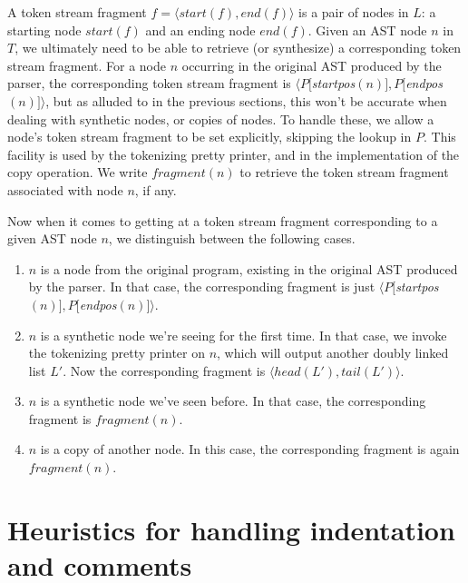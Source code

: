 A token stream fragment $f = \langle start(f), end(f) \rangle$ is a pair of
nodes in $L$: a starting node $start(f)$ and an ending node $end(f)$. Given an
AST node $n$ in $T$, we ultimately need to be able to retrieve (or synthesize)
a corresponding token stream fragment. For a node $n$ occurring in the original
AST produced by the parser, the corresponding token stream fragment is $\langle
P[$\emph{startpos}$(n)], P[$\emph{endpos}$(n)] \rangle$, but as alluded to in
the previous sections, this won't be accurate when dealing with synthetic
nodes, or copies of nodes. To handle these, we allow a node's token stream
fragment to be set explicitly, skipping the lookup in $P$. This facility is
used by the tokenizing pretty printer, and in the implementation of the copy
operation. We write $fragment(n)$ to retrieve the token stream fragment
associated with node $n$, if any.

Now when it comes to getting at a token stream fragment corresponding to a
given AST node $n$, we distinguish between the following cases.

\begin{enumerate}
  \item $n$ is a node from the original program, existing in the original
    AST produced by the parser. In that case, the corresponding fragment
    is just $\langle P[$\emph{startpos}$(n)], P[$\emph{endpos}$(n)] \rangle$.
  \item $n$ is a synthetic node we're seeing for the first time. In that case,
    we invoke the tokenizing pretty printer on $n$, which will output another
    doubly linked list $L'$. Now the corresponding fragment is
    $\langle head(L'), tail(L') \rangle$.
  \item $n$ is a synthetic node we've seen before. In that case, the corresponding
    fragment is $fragment(n)$.
  \item $n$ is a copy of another node. In this case, the corresponding fragment is
    again $fragment(n)$.
\end{enumerate}

\section{Heuristics for handling indentation and comments}


